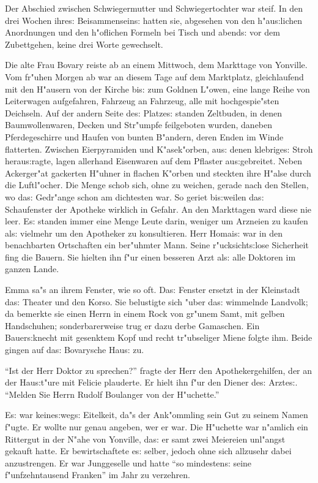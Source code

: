 \documentclass[oneside,12pt]{book}
\newcommand{\s}{s:}%
\begin{document}
Der Abschied zwischen Schwiegermutter und Schwiegertochter war
steif. In den drei Wochen ihre{\s} Beisammensein{\s} hatten sie,
abgesehen von den h"au{\s}lichen Anordnungen und den h"oflichen
Formeln bei Tisch und abend{\s} vor dem Zubettgehen, keine drei
Worte gewechselt.

Die alte Frau Bovary reiste ab an einem Mittwoch, dem Markttage
von Yonville. Vom fr"uhen Morgen ab war an diesem Tage auf dem
Marktplatz, gleichlaufend mit den H"ausern von der Kirche bi{\s}
zum Goldnen L"owen, eine lange Reihe von Leiterwagen aufgefahren,
Fahrzeug an Fahrzeug, alle mit hochgespie"sten Deichseln. Auf der
andern Seite de{\s} Platze{\s} standen Zeltbuden, in denen
Baumwollenwaren, Decken und Str"umpfe feilgeboten wurden, daneben
Pferdegeschirre und Haufen von bunten B"andern, deren Enden im
Winde flatterten. Zwischen Eierpyramiden und K"asek"orben, au{\s}
denen klebrige{\s} Stroh herau{\s}ragte, lagen allerhand
Eisenwaren auf dem Pflaster au{\s}gebreitet. Neben Ackerger"at
gackerten H"uhner in flachen K"orben und steckten ihre H"alse
durch die Luftl"ocher. Die Menge schob sich, ohne zu weichen,
gerade nach den Stellen, wo da{\s} Gedr"ange schon am dichtesten
war. So geriet bi{\s}weilen da{\s} Schaufenster der Apotheke
wirklich in Gefahr. An den Markttagen ward diese nie leer. E{\s}
standen immer eine Menge Leute darin, weniger um Arzneien zu
kaufen al{\s} vielmehr um den Apotheker zu konsultieren. Herr
Homai{\s} war in den benachbarten Ortschaften ein ber"uhmter Mann.
Seine r"ucksicht{\s}lose Sicherheit fing die Bauern. Sie hielten
ihn f"ur einen besseren Arzt al{\s} alle Doktoren im ganzen Lande.

Emma sa"s an ihrem Fenster, wie so oft. Da{\s} Fenster ersetzt in
der Kleinstadt da{\s} Theater und den Korso. Sie belustigte sich
"uber da{\s} wimmelnde Landvolk; da bemerkte sie einen Herrn in
einem Rock von gr"unem Samt, mit gelben Handschuhen;
sonderbarerweise trug er dazu derbe Gamaschen. Ein Bauer{\s}knecht
mit gesenktem Kopf und recht tr"ubseliger Miene folgte ihm. Beide
gingen auf da{\s} Bovarysche Hau{\s} zu.

"`Ist der Herr Doktor zu sprechen?"' fragte der Herr den
Apothekergehilfen, der an der Hau{\s}t"ure mit Felicie plauderte.
Er hielt ihn f"ur den Diener de{\s} Arzte{\s}. "`Melden Sie Herrn
Rudolf Boulanger von der H"uchette."'

E{\s} war keine{\s}weg{\s} Eitelkeit, da"s der Ank"ommling sein
Gut zu seinem Namen f"ugte. Er wollte nur genau angeben, wer er
war. Die H"uchette war n"amlich ein Rittergut in der N"ahe von
Yonville, da{\s} er samt zwei Meiereien unl"angst gekauft hatte.
Er bewirtschaftete e{\s} selber, jedoch ohne sich allzusehr dabei
anzustrengen. Er war Junggeselle und hatte "`so mindesten{\s}
seine f"unfzehntausend Franken"' im Jahr zu verzehren.
\end{document}
